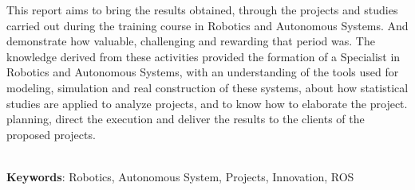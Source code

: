 \begin{thesisabastract}
This report aims to bring the results obtained, through the projects and studies carried out during the training course in Robotics and Autonomous Systems. And demonstrate how valuable, challenging and rewarding that period was. The knowledge derived from these activities provided the formation of a Specialist in Robotics and Autonomous Systems, with an understanding of the tools used for modeling, simulation and real construction of these systems, about how statistical studies are applied to analyze projects, and to know how to elaborate the project. planning, direct the execution and deliver the results to the clients of the proposed projects.

\ \\


\textbf{Keywords}: Robotics, Autonomous System, Projects, Innovation, ROS

\end{thesisabastract}
